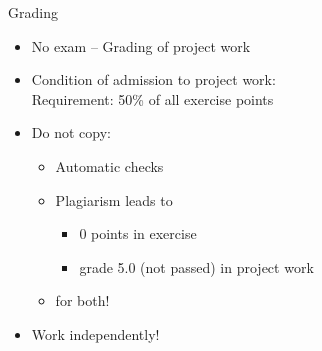 \begin{frame}
\begin{columns}[c, onlytextwidth]
\begin{column}{0.3\textwidth}
		\end{column}
	\end{columns}
\end{frame}

\begin{frame}[c]{Grading}
	\begin{itemize}
		\setlength\itemsep{0.4cm}
		\item No exam -- Grading of project work
		\item Condition of admission to project work:\\
		      Requirement: 50\% of all exercise points
		\item Do not copy:
		      \begin{itemize}
			      \item Automatic checks
			      \item Plagiarism leads to
			            \begin{itemize}
				            \item 0 points in exercise
				            \item grade 5.0 (not passed) in project work
			            \end{itemize}
			      \item for both!
		      \end{itemize}
		\item Work independently!
	\end{itemize}
\end{frame}

